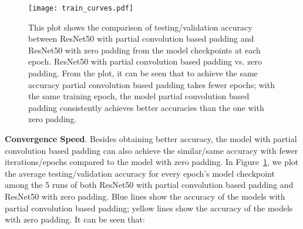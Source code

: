 \documentclass[10pt,twocolumn,letterpaper]{article}
\begin{document}
\begin{figure}
    \centering
    \texttt{[image: train\_curves.pdf]}
    \caption{This plot shows the comparison of testing/validation accuracy between ResNet50 with partial convolution based padding and ResNet50 with zero padding from the model checkpoints at each epoch. ResNet50 with partial convolution based padding vs. zero padding. From the plot, it can be seen that to achieve the same accuracy partial convolution based padding takes fewer epochs; with the same training epoch, the model partial convolution based padding consistently achieves better accuracies than the one with zero padding.}
    \label{fig:rn50_convergence}
\end{figure}\textbf{Convergence Speed}. Besides obtaining better accuracy, the model with partial convolution based padding can also achieve the similar/same accuracy with fewer iterations/epochs compared to the model with zero padding. In Figure~\ref{fig:rn50_convergence}, we plot the average testing/validation accuracy for every epoch's model checkpoint among the 5 runs of both ResNet50 with partial convolution based padding and ResNet50 with zero padding. Blue lines show the accuracy of the models with partial convolution based padding; yellow lines show the accuracy of the models with zero padding. It can be seen that: 
\end{document}
